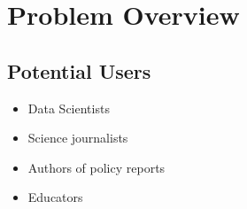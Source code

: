 \section{Problem Overview}
\label{sec:overview}

%
%

\subsection{Potential Users}

\begin{itemize}
\item Data Scientists
\item Science journalists
\item Authors of policy reports
\item Educators
\end{itemize}


